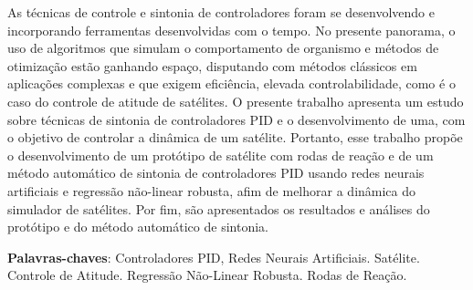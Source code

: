 \setlength{\absparsep}{18pt} %
\begin{resumo}
    As técnicas de controle e sintonia de controladores foram se desenvolvendo e incorporando ferramentas desenvolvidas com o tempo. No presente panorama, o  uso de algoritmos que simulam o comportamento de organismo e métodos de otimização estão ganhando espaço, disputando com métodos clássicos em aplicações complexas e que exigem eficiência, elevada controlabilidade, como é o caso do controle de atitude de satélites. O presente trabalho apresenta um estudo sobre técnicas de sintonia de controladores PID e o desenvolvimento de uma, com o objetivo de controlar a dinâmica de um satélite. Portanto, esse trabalho propõe o desenvolvimento de um protótipo de satélite com rodas de reação e de um método automático de sintonia de controladores PID usando redes neurais artificiais e regressão não-linear robusta, afim de melhorar a dinâmica do simulador de satélites. Por fim, são apresentados os resultados e análises do protótipo e do método automático de sintonia.
	\vspace{\onelineskip}
	\noindent 
	
	\textbf{Palavras-chaves}: Controladores PID, Redes Neurais Artificiais. Satélite. Controle de Atitude. Regressão Não-Linear Robusta. Rodas de Reação. 
\end{resumo}

 
